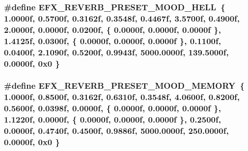 \subsubsection[{\texorpdfstring{E\+F\+X\+\_\+\+R\+E\+V\+E\+R\+B\+\_\+\+P\+R\+E\+S\+E\+T\+\_\+\+M\+O\+O\+D\+\_\+\+H\+E\+LL}{EFX_REVERB_PRESET_MOOD_HELL}}]{\setlength{\rightskip}{0pt plus 5cm}\#define E\+F\+X\+\_\+\+R\+E\+V\+E\+R\+B\+\_\+\+P\+R\+E\+S\+E\+T\+\_\+\+M\+O\+O\+D\+\_\+\+H\+E\+LL~\{ 1.\+0000f, 0.\+5700f, 0.\+3162f, 0.\+3548f, 0.\+4467f, 3.\+5700f, 0.\+4900f, 2.\+0000f, 0.\+0000f, 0.\+0200f, \{ 0.\+0000f, 0.\+0000f, 0.\+0000f \}, 1.\+4125f, 0.\+0300f, \{ 0.\+0000f, 0.\+0000f, 0.\+0000f \}, 0.\+1100f, 0.\+0400f, 2.\+1090f, 0.\+5200f, 0.\+9943f, 5000.\+0000f, 139.\+5000f, 0.\+0000f, 0x0 \}}\hypertarget{efx-presets_8h_accdcedee2b00834ee55cd5a557a37eba}{}\label{efx-presets_8h_accdcedee2b00834ee55cd5a557a37eba}
\subsubsection[{\texorpdfstring{E\+F\+X\+\_\+\+R\+E\+V\+E\+R\+B\+\_\+\+P\+R\+E\+S\+E\+T\+\_\+\+M\+O\+O\+D\+\_\+\+M\+E\+M\+O\+RY}{EFX_REVERB_PRESET_MOOD_MEMORY}}]{\setlength{\rightskip}{0pt plus 5cm}\#define E\+F\+X\+\_\+\+R\+E\+V\+E\+R\+B\+\_\+\+P\+R\+E\+S\+E\+T\+\_\+\+M\+O\+O\+D\+\_\+\+M\+E\+M\+O\+RY~\{ 1.\+0000f, 0.\+8500f, 0.\+3162f, 0.\+6310f, 0.\+3548f, 4.\+0600f, 0.\+8200f, 0.\+5600f, 0.\+0398f, 0.\+0000f, \{ 0.\+0000f, 0.\+0000f, 0.\+0000f \}, 1.\+1220f, 0.\+0000f, \{ 0.\+0000f, 0.\+0000f, 0.\+0000f \}, 0.\+2500f, 0.\+0000f, 0.\+4740f, 0.\+4500f, 0.\+9886f, 5000.\+0000f, 250.\+0000f, 0.\+0000f, 0x0 \}}\hypertarget{efx-presets_8h_a1ba43992b2442a1acc119886f320cdaa}{}\label{efx-presets_8h_a1ba43992b2442a1acc119886f320cdaa}
